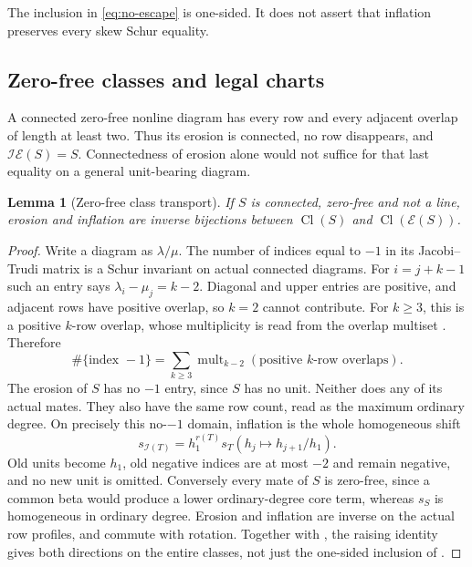 \documentclass[11pt,a4paper]{amsart}
\numberwithin{equation}{section}
\theoremstyle{plain}
\newtheorem{lemma}[theorem]{Lemma}
\theoremstyle{definition}
\begin{document}
The inclusion in \eqref{eq:no-escape} is one-sided.  It does not assert
that inflation preserves every skew Schur equality.

\subsection{Zero-free classes and legal charts}

A connected zero-free nonline diagram has every row and every adjacent overlap
of length at least two.  Thus its erosion is connected, no row disappears,
and \(\mathcal I\mathcal E(S)=S\).  Connectedness of erosion alone would not
suffice for that last equality on a general unit-bearing diagram.

\begin{lemma}[Zero-free class transport]\label{lem:zero-free-bijection}
If \(S\) is connected, zero-free and not a line, erosion and inflation are
inverse bijections between \(\operatorname{Cl}(S)\) and
\(\operatorname{Cl}(\mathcal E(S))\).
\end{lemma}
\begin{proof}
Write a diagram as \(\lambda/\mu\).  The number of indices equal to
\(-1\) in its Jacobi--Trudi matrix is a Schur invariant on actual
connected diagrams.  For \(i=j+k-1\) such an entry says
\(\lambda_i-\mu_j=k-2\).  Diagonal and upper entries are positive,
and adjacent rows have positive overlap, so \(k=2\) cannot contribute.
For \(k\ge3\), this is a positive \(k\)-row overlap, whose multiplicity
is read from the overlap multiset \cite{Reiner2007Coincidences}.  Therefore
\[
 \#\{\text{index }-1\}
 =\sum_{k\ge3}\operatorname{mult}_{k-2}
   (\text{positive \(k\)-row overlaps}).
\]
The erosion of \(S\) has no \(-1\) entry, since \(S\) has no unit.  Neither
does any of its actual mates.  They also have the same row count, read
as the maximum ordinary degree.  On precisely this no-\(-1\) domain,
inflation is the whole homogeneous shift
\[
 s_{\mathcal I(T)}=h_1^{r(T)}s_T(h_j\mapsto h_{j+1}/h_1).
\]
Old units become \(h_1\), old negative indices are at most \(-2\) and remain
negative, and no new unit is omitted.  Conversely every mate of \(S\) is
zero-free, since a common beta would produce a lower ordinary-degree core
term, whereas \(s_S\) is homogeneous in ordinary degree.  Erosion and inflation
are inverse on the actual row profiles, and commute with rotation.
Together with , the raising identity gives both
directions on the entire classes, not just the one-sided inclusion
of .
\end{proof}
\end{document}
